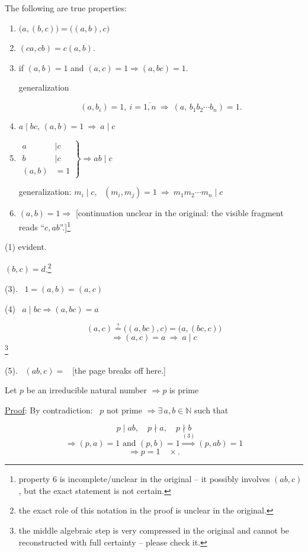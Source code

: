 \documentclass[12pt]{article}
\begin{document}
\noindent The following are true properties:

\begin{enumerate}
\item[1.] $\big(a,(b,c)\big) = \big((a,b),c\big)$
\item[2.] $(ca,cb) = c(a,b)$.
\item[3.] if $(a,b)=1$ and $(a,c)=1 \Rightarrow (a,bc)=1$.

\noindent generalization

\[
(a,b_i)=1,\ i=\overline{1,n} \ \Rightarrow \ (a,\,b_1b_2\cdots b_n)=1.
\]

\item[4.] $a\mid bc$, $(a,b)=1 \ \Rightarrow \ a\mid c$

\item[5.] $\left.\begin{aligned} a&\mid c\\ b&\mid c\\ (a,b)&=1\end{aligned}\right\} \Rightarrow ab\mid c$

\noindent generalization: \quad $m_i\mid c$, \ $(m_i,m_j)=1 \ \Rightarrow \ m_1m_2\cdots m_n\mid c$

\item[6.] $(a,b)=1 \Rightarrow$ [continuation unclear in the original: the visible fragment reads ``$c,ab$''.]\footnote{property 6 is incomplete/unclear in the original -- it possibly involves $(ab,c)$, but the exact statement is not certain.}
\end{enumerate}

\bigskip
\noindent (1) evident.

\noindent $(b,c)=d$.\footnote{the exact role of this notation in the proof is unclear in the original.}

\bigskip
\noindent (3). \ $1=(a,b)=(a,c)$

\bigskip
\noindent (4) \ $a\mid bc \Rightarrow (a,bc)=a$

\[
(a,c) \overset{?}{=} \big((a,bc),c\big) = \big(a,(bc,c)\big)
\]
\[
\Rightarrow (a,c)=a \ \Rightarrow \ a\mid c
\]
\noindent\footnote{the middle algebraic step is very compressed in the original and cannot be reconstructed with full certainty -- please check it.}

\bigskip
\noindent (5). \ $(ab,c)=$ \ [the page breaks off here.]

\bigskip
\noindent Let $p$ be an irreducible natural number $\Rightarrow p$ is prime

\noindent\underline{Proof}: By contradiction: \ $p$ not prime $\Rightarrow \exists\,a,b\in\mathbb{N}$ such that

\[
p\mid ab,\quad p\nmid a,\quad p\nmid b
\]
\[
\Rightarrow (p,a)=1 \text{ and } (p,b)=1 \overset{(3)}{\Longrightarrow} (p,ab)=1
\]
\[
\Rightarrow p=1 \quad \times.
\]
\end{document}
